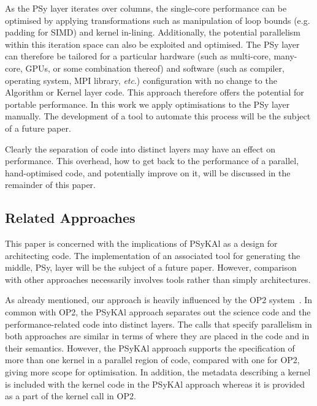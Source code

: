 \documentclass[gmdd, manuscript]{copernicus}
\begin{document}
As the PSy layer iterates over columns, the single-core performance
can be optimised by applying transformations such as manipulation of
loop bounds (e.g. padding for SIMD) and kernel
in-lining. Additionally, the potential parallelism within this
iteration space can also be exploited and optimised. The PSy layer can
therefore be tailored for a particular hardware (such as multi-core,
many-core, GPUs, or some combination thereof) and software (such as
compiler, operating system, MPI library, \textit{etc}.) configuration
with no change to the Algorithm or Kernel layer code. This approach
therefore offers the potential for portable performance. In this work
we apply optimisations to the PSy layer manually. The development of a
tool to automate this process will be the subject of a future paper.

Clearly the separation of code into distinct layers may have an effect
on performance. This overhead, how to get back to the performance of a
parallel, hand-optimised code, and potentially improve on it, will be
discussed in the remainder of this paper.

\subsection{Related Approaches}
\label{sec_other_approaches}

This paper is concerned with the implications of {PS}y{KA}l as a
design for architecting code. The implementation of an associated tool
for generating the middle, {PS}y, layer will be the subject of a future
paper. However, comparison with other approaches necessarily involves
tools rather than simply architectures.

As already mentioned, our approach is heavily influenced by the OP2
system~\citep{OP2, PYOP2}.
In common with OP2, the {PS}y{KA}l approach separates out the science
code and the performance-related code into distinct layers. The calls
that specify parallelism in both approaches are similar in terms of
where they are placed in the code and in their semantics. However, the
{PS}y{KA}l approach supports the specification of more than one kernel
in a parallel region of code, compared with one for OP2, giving more
scope for optimisation. In addition, the metadata describing a kernel
is included with the kernel code in the {PS}y{KA}l approach whereas it
is provided as a part of the kernel call in OP2.
\end{document}
